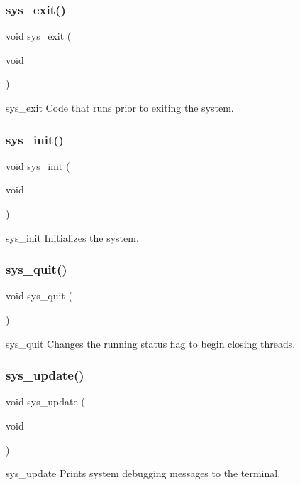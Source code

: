 \subsubsection{sys\+\_\+exit()}
{\footnotesize\ttfamily void sys\+\_\+exit (\begin{DoxyParamCaption}\item[{void}]{ }\end{DoxyParamCaption})}

sys\+\_\+exit Code that runs prior to exiting the system. \mbox{\label{sys_8c_af411a8bc6b7ed4b0af9114e10c959448}} 
\subsubsection{sys\+\_\+init()}
{\footnotesize\ttfamily void sys\+\_\+init (\begin{DoxyParamCaption}\item[{void}]{ }\end{DoxyParamCaption})}

sys\+\_\+init Initializes the system. \mbox{\label{sys_8c_a7452240234dccdd008b189f22ad70469}} 
\subsubsection{sys\+\_\+quit()}
{\footnotesize\ttfamily void sys\+\_\+quit (\begin{DoxyParamCaption}{ }\end{DoxyParamCaption})}

sys\+\_\+quit Changes the \textquotesingle{}running\textquotesingle{} status flag to begin closing threads. \mbox{\label{sys_8c_aa21074a5e744e59d10aa2ae116479031}} 
\subsubsection{sys\+\_\+update()}
{\footnotesize\ttfamily void sys\+\_\+update (\begin{DoxyParamCaption}\item[{void}]{ }\end{DoxyParamCaption})}

sys\+\_\+update Prints system debugging messages to the terminal. 